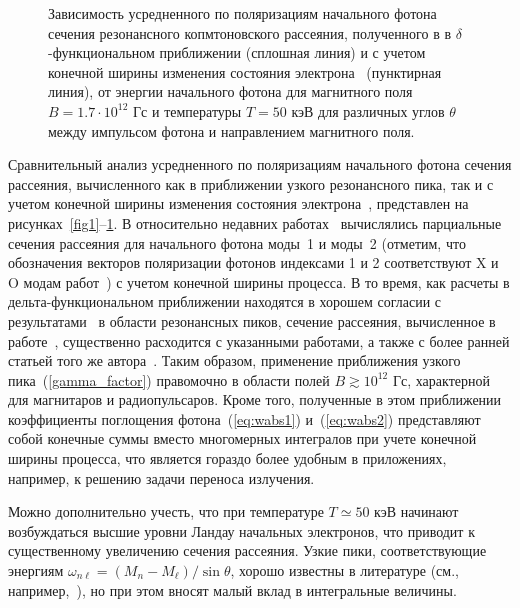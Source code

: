 \documentclass[cp1251%
               ]{jetp} %
\begin{document}
\begin{figure}[t!]
\caption{Зависимость усредненного по поляризациям начального фотона сечения резонансного копмтоновского рассеяния, полученного в в $\delta$-функциональном приближении (сплошная линия) и с учетом конечной ширины изменения состояния электрона~\cite{Harding:1991} (пунктирная линия), от энергии начального фотона для магнитного поля $B = 1.7 \cdot 10^{12}$ Гс и температуры $T=50$ кэВ для различных углов $\theta$ между импульсом фотона и направлением магнитного поля.}
\label{fig4}
\end{figure}

Сравнительный анализ усредненного по поляризациям начального фотона сечения 
рассеяния, вычисленного как в приближении узкого резонансного пика, так и с 
учетом конечной ширины изменения состояния электрона~\cite{Harding:1991,SchwarmD:2017}, представлен на 
рисунках~\ref{fig1}--\ref{fig4}.  
В относительно недавних работах~\cite{Mushtukov:2016,SchwarmD:2017} вычислялись 
парциальные сечения рассеяния для начального фотона моды~1 и моды~2 (отметим, что обозначения векторов поляризации фотонов индексами 1 и 2 соответствуют X и O модам работ~\cite{Mushtukov:2016,SchwarmD:2017}) с учетом 
конечной ширины процесса. В то время, как расчеты в дельта-функциональном 
приближении находятся в хорошем согласии с 
результатами~\cite{Harding:1991,SchwarmD:2017} в области резонансных пиков, 
сечение рассеяния, вычисленное в работе~\cite{Mushtukov:2016}, существенно 
расходится с указанными работами, а также с более ранней статьей того же 
автора~\cite{Mushtukov:2015}. Таким образом, применение 
приближения узкого пика~(\ref{gamma_factor}) правомочно  в области полей $B \gtrsim 10^{12}$ Гс, характерной для магнитаров и радиопульсаров. Кроме того, 
полученные в этом приближении коэффициенты поглощения фотона~(\ref{eq:wabs1}) 
и~(\ref{eq:wabs2}) 
представляют собой конечные суммы вместо многомерных интегралов при учете 
конечной ширины процесса, что является гораздо более 
удобным в приложениях, например, к решению задачи переноса излучения.

Можно дополнительно учесть, что при температуре $T\simeq 50$ кэВ начинают 
возбуждаться высшие уровни Ландау начальных электронов, что приводит к 
существенному увеличению  сечения рассеяния. Узкие пики, соответствующие 
энергиям $\omega_{n\ell}=(M_n-M_\ell)/\sin \theta$, хорошо известны в 
литературе (см., например,~\cite{Pavlov:1991,Klepikov:1954,Baier:2007}), но при этом вносят 
малый вклад в интегральные величины.


\end{document}
